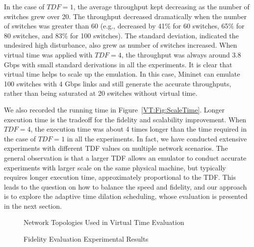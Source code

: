 In the case of $TDF = 1$, the average throughput kept decreasing as the number of switches grew over 20.
The throughput decreased dramatically when the number of switches was greater than 60 (e.g., decreased by 41\% for 60 switches, 65\% for 80 switches, and 83\% for 100 switches).
The standard deviation, indicated the undesired high disturbance, also grew as number of switches increased.
When virtual time was applied with $TDF = 4$, the throughput was always around 3.8 Gbps with small standard derivations in all the experiments.
It is clear that virtual time helps to scale up the emulation.
In this case, Mininet can emulate 100 switches with 4 Gbps links and still generate the accurate throughputs,
rather than being saturated at 20 switches without virtual time. 

We also recorded the running time in Figure~\ref{VT:Fig:ScaleTime}.
Longer execution time is the tradeoff for the fidelity and scalability improvement.
When $TDF=4$, the execution time was about 4 times longer than the time required in the case of $TDF=1$ in all the experiments.
In fact, we have conducted extensive experiments with different TDF values on multiple network scenarios.
The general observation is that a larger TDF allows an emulator to conduct accurate experiments with larger scale on the same physical machine,
but typically requires longer execution time, approximately proportional to the TDF.
This leads to the question on how to balance the speed and fidelity,
and our approach is to explore the adaptive time dilation scheduling, whose evaluation is presented in the next section. 

\begin{figure}
    \centering
    \caption{Network Topologies Used in Virtual Time Evaluation}
\end{figure}

\begin{figure}
    \centering
    \caption{Fidelity Evaluation Experimental Results}
\end{figure}

